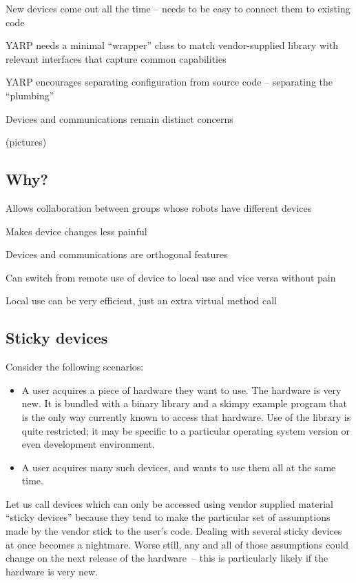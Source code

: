 New devices come out all the time -- needs to be easy to connect them
to existing code

YARP needs a minimal ``wrapper'' class to match vendor-supplied
library with relevant interfaces that capture common capabilities

YARP encourages separating configuration from source code -- separating
the ``plumbing''

Devices and communications remain distinct concerns

(pictures)


\subsection*{Why?}

Allows collaboration between groups whose robots have different devices

Makes device changes less painful

Devices and communications are orthogonal features

Can switch from remote use of device to local use and vice versa without pain

Local use can be very efficient, just an extra virtual method call





\subsection{Sticky devices}

Consider the following scenarios:

\begin{itemize}

\item A user acquires a piece of hardware they want to use.  The
hardware is very new.  It is bundled with a binary library and a
skimpy example program that is the only way currently known to access
that hardware.  Use of the library is quite restricted; it may be
specific to a particular operating system version or even development
environment.

\item A user acquires many such devices, and wants to use them
all at the same time.

\end{itemize}

Let us call devices which can only be accessed using vendor supplied
material ``sticky devices'' because they tend to make the particular
set of assumptions made by the vendor stick to the user's code.
Dealing with several sticky devices at once becomes a nightmare.
Worse still, any and all of those assumptions could change on the
next release of the hardware~-- this is particularly likely if the 
hardware is very new.

